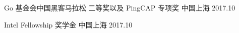 
\begin{cvhonors}

  \cvhonor
    {Go 基金会中国黑客⻢拉松} %
    {二等奖以及 PingCAP 专项奖} %
    {中国上海} %
    {2017.10} %

  \cvhonor
    {Intel Fellowship} %
    {奖学金} %
    {中国上海} %
    {2017.10} %
\end{cvhonors}
